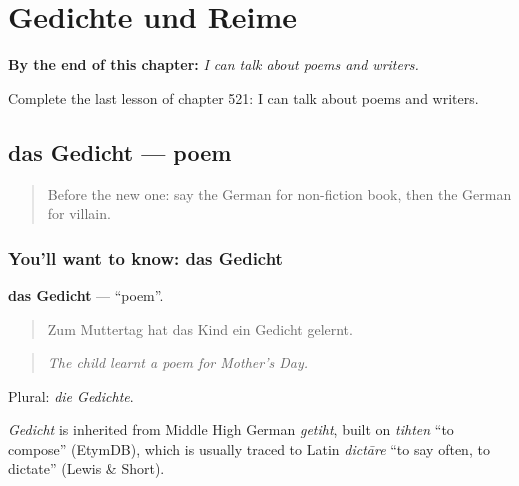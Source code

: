 
\chapter{Gedichte und Reime}
\label{ch:ge-gedichte-und-reime}

\begin{chapteropening}
\textbf{By the end of this chapter:} \emph{I can talk about poems and writers.}

Complete the last lesson of chapter 521: I can talk about poems and writers.
\end{chapteropening}

\section[das Gedicht]{das Gedicht — poem}

\label{lesson:GE-C521-gedicht}



\begin{quote}
Before the new one: say the German for non-fiction book, then the German for villain.
\end{quote}

\subsection*{You'll want to know: das Gedicht}
\textbf{das Gedicht} — \textquotedblleft{}poem\textquotedblright{}.

\begin{quote}
Zum Muttertag hat das Kind ein Gedicht gelernt.
\end{quote}

\begin{quote}
\emph{The child learnt a poem for Mother's Day.}
\end{quote}

Plural: \emph{die Gedichte}.

\begin{cousinweb}
\emph{Gedicht} is inherited from Middle High German \emph{getiht}, built on \emph{tihten} \textquotedblleft{}to compose\textquotedblright{} (EtymDB), which is usually traced to Latin \emph{dictāre} \textquotedblleft{}to say often, to dictate\textquotedblright{} (Lewis \& Short).
\end{cousinweb}

